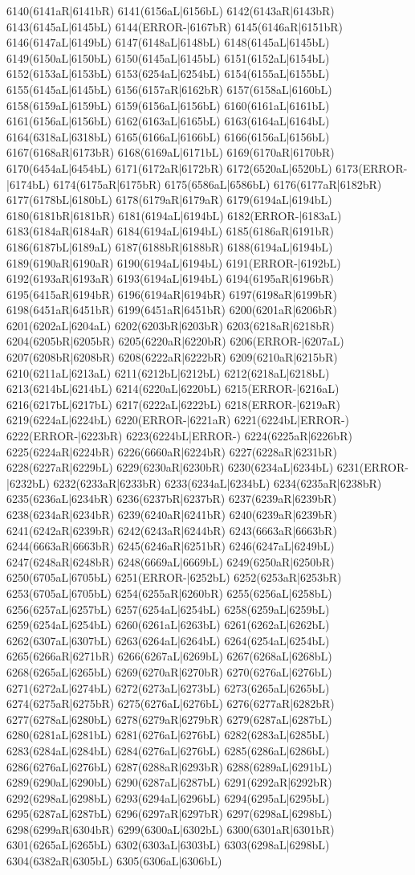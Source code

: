 6140(6141aR|6141bR) 6141(6156aL|6156bL) 6142(6143aR|6143bR) 6143(6145aL|6145bL) 6144(ERROR-|6167bR) 6145(6146aR|6151bR) 6146(6147aL|6149bL) 6147(6148aL|6148bL) 6148(6145aL|6145bL) 6149(6150aL|6150bL) 6150(6145aL|6145bL) 6151(6152aL|6154bL) 6152(6153aL|6153bL) 6153(6254aL|6254bL) 6154(6155aL|6155bL) 6155(6145aL|6145bL) 6156(6157aR|6162bR) 6157(6158aL|6160bL) 6158(6159aL|6159bL) 6159(6156aL|6156bL) 6160(6161aL|6161bL) 6161(6156aL|6156bL) 6162(6163aL|6165bL) 6163(6164aL|6164bL) 6164(6318aL|6318bL) 6165(6166aL|6166bL) 6166(6156aL|6156bL) 6167(6168aR|6173bR) 6168(6169aL|6171bL) 6169(6170aR|6170bR) 6170(6454aL|6454bL) 6171(6172aR|6172bR) 6172(6520aL|6520bL) 6173(ERROR-|6174bL) 6174(6175aR|6175bR) 6175(6586aL|6586bL) 6176(6177aR|6182bR) 6177(6178bL|6180bL) 6178(6179aR|6179aR) 6179(6194aL|6194bL) 6180(6181bR|6181bR) 6181(6194aL|6194bL) 6182(ERROR-|6183aL) 6183(6184aR|6184aR) 6184(6194aL|6194bL) 6185(6186aR|6191bR) 6186(6187bL|6189aL) 6187(6188bR|6188bR) 6188(6194aL|6194bL) 6189(6190aR|6190aR) 6190(6194aL|6194bL) 6191(ERROR-|6192bL) 6192(6193aR|6193aR) 6193(6194aL|6194bL) 6194(6195aR|6196bR) 6195(6415aR|6194bR) 6196(6194aR|6194bR) 6197(6198aR|6199bR) 6198(6451aR|6451bR) 6199(6451aR|6451bR) 6200(6201aR|6206bR) 6201(6202aL|6204aL) 6202(6203bR|6203bR) 6203(6218aR|6218bR) 6204(6205bR|6205bR) 6205(6220aR|6220bR) 6206(ERROR-|6207aL) 6207(6208bR|6208bR) 6208(6222aR|6222bR) 6209(6210aR|6215bR) 6210(6211aL|6213aL) 6211(6212bL|6212bL) 6212(6218aL|6218bL) 6213(6214bL|6214bL) 6214(6220aL|6220bL) 6215(ERROR-|6216aL) 6216(6217bL|6217bL) 6217(6222aL|6222bL) 6218(ERROR-|6219aR) 6219(6224aL|6224bL) 6220(ERROR-|6221aR) 6221(6224bL|ERROR-) 6222(ERROR-|6223bR) 6223(6224bL|ERROR-) 6224(6225aR|6226bR) 6225(6224aR|6224bR) 6226(6660aR|6224bR) 6227(6228aR|6231bR) 6228(6227aR|6229bL) 6229(6230aR|6230bR) 6230(6234aL|6234bL) 6231(ERROR-|6232bL) 6232(6233aR|6233bR) 6233(6234aL|6234bL) 6234(6235aR|6238bR) 6235(6236aL|6234bR) 6236(6237bR|6237bR) 6237(6239aR|6239bR) 6238(6234aR|6234bR) 6239(6240aR|6241bR) 6240(6239aR|6239bR) 6241(6242aR|6239bR) 6242(6243aR|6244bR) 6243(6663aR|6663bR) 6244(6663aR|6663bR) 6245(6246aR|6251bR) 6246(6247aL|6249bL) 6247(6248aR|6248bR) 6248(6669aL|6669bL) 6249(6250aR|6250bR) 6250(6705aL|6705bL) 6251(ERROR-|6252bL) 6252(6253aR|6253bR) 6253(6705aL|6705bL) 6254(6255aR|6260bR) 6255(6256aL|6258bL) 6256(6257aL|6257bL) 6257(6254aL|6254bL) 6258(6259aL|6259bL) 6259(6254aL|6254bL) 6260(6261aL|6263bL) 6261(6262aL|6262bL) 6262(6307aL|6307bL) 6263(6264aL|6264bL) 6264(6254aL|6254bL) 6265(6266aR|6271bR) 6266(6267aL|6269bL) 6267(6268aL|6268bL) 6268(6265aL|6265bL) 6269(6270aR|6270bR) 6270(6276aL|6276bL) 6271(6272aL|6274bL) 6272(6273aL|6273bL) 6273(6265aL|6265bL) 6274(6275aR|6275bR) 6275(6276aL|6276bL) 6276(6277aR|6282bR) 6277(6278aL|6280bL) 6278(6279aR|6279bR) 6279(6287aL|6287bL) 6280(6281aL|6281bL) 6281(6276aL|6276bL) 6282(6283aL|6285bL) 6283(6284aL|6284bL) 6284(6276aL|6276bL) 6285(6286aL|6286bL) 6286(6276aL|6276bL) 6287(6288aR|6293bR) 6288(6289aL|6291bL) 6289(6290aL|6290bL) 6290(6287aL|6287bL) 6291(6292aR|6292bR) 6292(6298aL|6298bL) 6293(6294aL|6296bL) 6294(6295aL|6295bL) 6295(6287aL|6287bL) 6296(6297aR|6297bR) 6297(6298aL|6298bL) 6298(6299aR|6304bR) 6299(6300aL|6302bL) 6300(6301aR|6301bR) 6301(6265aL|6265bL) 6302(6303aL|6303bL) 6303(6298aL|6298bL) 6304(6382aR|6305bL) 6305(6306aL|6306bL) 